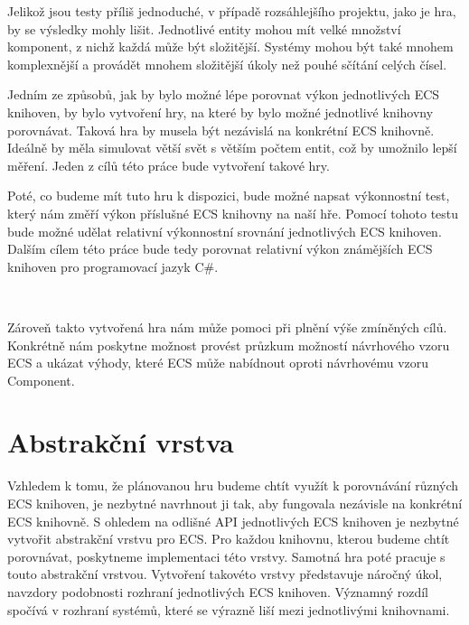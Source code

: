 Jelikož jsou testy příliš jednoduché, v případě rozsáhlejšího projektu, jako je hra, by se výsledky mohly lišit. Jednotlivé entity mohou mít velké množství komponent, z nichž každá může být složitější. Systémy mohou být také mnohem komplexnější a provádět mnohem složitější úkoly než pouhé sčítání celých čísel.

Jedním ze způsobů, jak by bylo možné lépe porovnat výkon jednotlivých ECS knihoven, by bylo vytvoření hry, na které by bylo možné jednotlivé knihovny porovnávat. Taková hra by musela být nezávislá na konkrétní ECS knihovně. Ideálně by měla simulovat větší svět s větším počtem entit, což by umožnilo lepší měření. Jeden z cílů této práce bude vytvoření takové hry.

Poté, co budeme mít tuto hru k dispozici, bude možné napsat výkonnostní test, který nám změří výkon příslušné ECS knihovny na naší hře. Pomocí tohoto testu bude možné udělat relativní výkonnostní srovnání jednotlivých ECS knihoven. Dalším cílem této práce bude tedy porovnat relativní výkon známějších ECS knihoven pro programovací jazyk C\#.

\\

Zároveň takto vytvořená hra nám může pomoci při plnění výše zmíněných cílů. Konkrétně nám poskytne možnost provést průzkum možností návrhového vzoru ECS a ukázat výhody, které ECS může nabídnout oproti návrhovému vzoru Component.

\section{Abstrakční vrstva}
Vzhledem k tomu, že plánovanou hru budeme chtít využít k porovnávání různých ECS knihoven, je nezbytné navrhnout ji tak, aby fungovala nezávisle na konkrétní ECS knihovně. S ohledem na odlišné API jednotlivých ECS knihoven je nezbytné vytvořit abstrakční vrstvu pro ECS. Pro každou knihovnu, kterou budeme chtít porovnávat, poskytneme implementaci této vrstvy. Samotná hra poté pracuje s touto abstrakční vrstvou. Vytvoření takovéto vrstvy představuje náročný úkol, navzdory podobnosti rozhraní jednotlivých ECS knihoven. Významný rozdíl spočívá v rozhraní systémů, které se výrazně liší mezi jednotlivými knihovnami.

